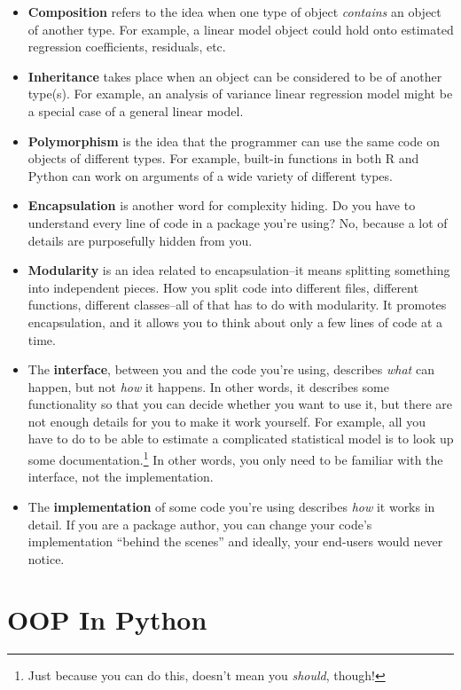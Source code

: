 \documentclass[
  12pt,
  krantz2]{krantz}
\begin{document}
\begin{itemize}
\item
  \textbf{Composition} refers to the idea when one type of object \emph{contains} an object of another type. For example, a linear model object could hold onto estimated regression coefficients, residuals, etc.
\item
  \textbf{Inheritance} takes place when an object can be considered to be of another type(s). For example, an analysis of variance linear regression model might be a special case of a general linear model.
\item
  \textbf{Polymorphism} is the idea that the programmer can use the same code on objects of different types. For example, built-in functions in both R and Python can work on arguments of a wide variety of different types.
\item
  \textbf{Encapsulation} is another word for complexity hiding. Do you have to understand every line of code in a package you're using? No, because a lot of details are purposefully hidden from you.
\item
  \textbf{Modularity} is an idea related to encapsulation--it means splitting something into independent pieces. How you split code into different files, different functions, different classes--all of that has to do with modularity. It promotes encapsulation, and it allows you to think about only a few lines of code at a time.
\item
  The \textbf{interface}, between you and the code you're using, describes \emph{what} can happen, but not \emph{how} it happens. In other words, it describes some functionality so that you can decide whether you want to use it, but there are not enough details for you to make it work yourself. For example, all you have to do to be able to estimate a complicated statistical model is to look up some documentation.\footnote{Just because you can do this, doesn't mean you \emph{should}, though!} In other words, you only need to be familiar with the interface, not the implementation.
\item
  The \textbf{implementation} of some code you're using describes \emph{how} it works in detail. If you are a package author, you can change your code's implementation ``behind the scenes'' and ideally, your end-users would never notice.
\end{itemize}

\hypertarget{oop-in-python}{%
\section{OOP In Python}\label{oop-in-python}}
\end{document}
